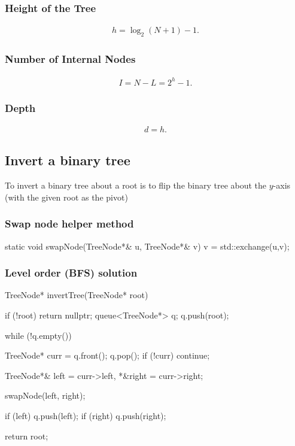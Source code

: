 \documentclass{report}
\begin{document}
\bigbreak \noindent 
\subsubsection{Height of the Tree}
\bigbreak \noindent 
\begin{align*}
    h = \log_2(N+1) - 1
.\end{align*}


\bigbreak \noindent 
\subsubsection{Number of Internal Nodes}
\bigbreak \noindent 
\begin{align*}
    I = N - L = 2^h - 1
.\end{align*}

\bigbreak \noindent 
\subsubsection{Depth}
\bigbreak \noindent 
\begin{align*}
    d = h
.\end{align*}

\pagebreak 
\subsection{Invert a binary tree}
\bigbreak \noindent 
To invert a binary tree about a root is to flip the binary tree about the $y$-axis (with the given root as the pivot)
\bigbreak \noindent 
{}
\bigbreak \noindent 
\subsubsection{Swap node helper method}
\bigbreak \noindent 
\begin{cppcode}
    static void swapNode(TreeNode*& u, TreeNode*& v) {
        v = std::exchange(u,v);
    }
\end{cppcode}
\bigbreak \noindent 
\subsubsection{Level order (BFS) solution}
\bigbreak \noindent 
\begin{cppcode}
    TreeNode* invertTree(TreeNode* root) {
        if (!root) return nullptr;
        queue<TreeNode*> q;
        q.push(root);

        while (!q.empty()) {
            TreeNode* curr = q.front(); q.pop();
            if (!curr) continue;

            TreeNode*& left = curr->left, *&right = curr->right;

            swapNode(left, right);

            if (left) q.push(left);
            if (right) q.push(right);
        }
        return root;
    }
\end{cppcode}
\end{document}
